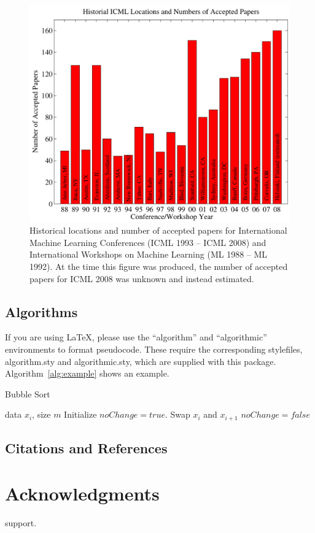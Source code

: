 \documentclass{article}
\begin{document}
\begin{figure}[ht]
\vskip 0.2in
\begin{center}
\centerline{\includegraphics[width=\columnwidth]{figs/examplegraph}}
\caption{Historical locations and number of accepted papers for International
  Machine Learning Conferences (ICML 1993 -- ICML 2008) and
  International Workshops on Machine Learning (ML 1988 -- ML
  1992). At the time this figure was produced, the number of
  accepted papers for ICML 2008 was unknown and instead estimated.}
\label{icml-historical}
\end{center}
\vskip -0.2in
\end{figure} 

\subsection{Algorithms}

If you are using \LaTeX, please use the ``algorithm'' and ``algorithmic'' 
environments to format pseudocode. These require 
the corresponding stylefiles, algorithm.sty and 
algorithmic.sty, which are supplied with this package. 
Algorithm~\ref{alg:example} shows an example. 

\begin{algorithm}[tb]
   \caption{Bubble Sort}
   \label{alg:example}
\begin{algorithmic}
    data $x_i$, size $m$
   \REPEAT
   \STATE Initialize $noChange = true$.
   \STATE Swap $x_i$ and $x_{i+1}$
   \STATE $noChange = false$
   \ENDIF
   \ENDFOR
\end{algorithmic}
\end{algorithm}
 
\subsection{Citations and References} 

\section*{Acknowledgments} 
 
support.  




\end{document}
